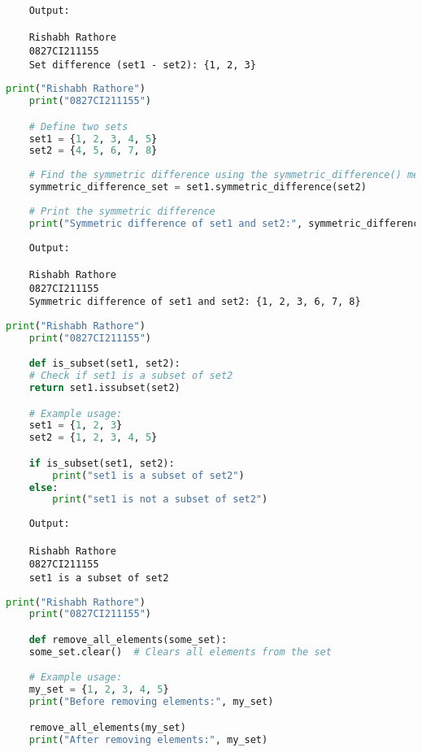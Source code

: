 \documentclass{report}
\begin{document}
\begin{verbatim}
	Output:

	Rishabh Rathore
	0827CI211155
	Set difference (set1 - set2): {1, 2, 3}

\end{verbatim}


\newpage


\sol 
\begin{lstlisting}[language=Python]
	print("Rishabh Rathore")
	print("0827CI211155")

	# Define two sets
	set1 = {1, 2, 3, 4, 5}
	set2 = {4, 5, 6, 7, 8}
	
	# Find the symmetric difference using the symmetric_difference() method
	symmetric_difference_set = set1.symmetric_difference(set2)
	
	# Print the symmetric difference
	print("Symmetric difference of set1 and set2:", symmetric_difference_set)
\end{lstlisting}

\begin{verbatim}
	Output:

	Rishabh Rathore
	0827CI211155
	Symmetric difference of set1 and set2: {1, 2, 3, 6, 7, 8}
\end{verbatim}


\newpage


\sol 
\begin{lstlisting}[language=Python]
	print("Rishabh Rathore")
	print("0827CI211155")

	def is_subset(set1, set2):
    # Check if set1 is a subset of set2
    return set1.issubset(set2)

	# Example usage:
	set1 = {1, 2, 3}
	set2 = {1, 2, 3, 4, 5}

	if is_subset(set1, set2):
		print("set1 is a subset of set2")
	else:
		print("set1 is not a subset of set2")
\end{lstlisting}

\begin{verbatim}
	Output:

	Rishabh Rathore
	0827CI211155
	set1 is a subset of set2

\end{verbatim}


\newpage


\sol 
\begin{lstlisting}[language=Python]
	print("Rishabh Rathore")
	print("0827CI211155")

	def remove_all_elements(some_set):
    some_set.clear()  # Clears all elements from the set

	# Example usage:
	my_set = {1, 2, 3, 4, 5}
	print("Before removing elements:", my_set)

	remove_all_elements(my_set)
	print("After removing elements:", my_set)
\end{lstlisting}
\end{document}
